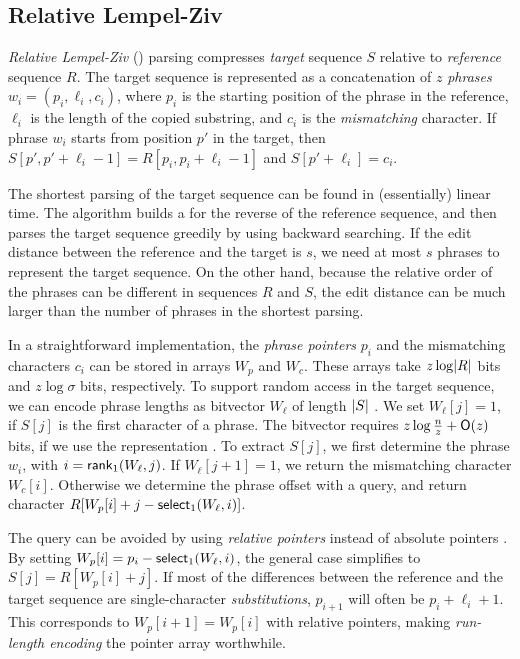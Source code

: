 \subsection{Relative Lempel-Ziv}\label{sect:rlz}

\emph{Relative Lempel-Ziv} (\RLZ) parsing \cite{Kuruppu2010} compresses
\emph{target} sequence $S$ relative to \emph{reference} sequence $R$. The
target sequence is represented as a concatenation of $z$ \emph{phrases} $w_{i}
= (p_{i}, \ell_{i}, c_{i})$, where $p_{i}$ is the starting position of the
phrase in the reference, $\ell_{i}$ is the length of the copied substring, and
$c_{i}$ is the \emph{mismatching} character. If phrase $w_{i}$ starts from
position $p'$ in the target, then $S[p',p'+\ell_{i}-1] =
R[p_{i},p_{i}+\ell_{i}-1]$ and $S[p'+\ell_{i}] = c_{i}$.

The shortest \RLZ{} parsing of the target sequence can be found in
(essentially) linear time. The algorithm builds a \CSA{} for the reverse of
the reference sequence, and then parses the target sequence greedily by using
backward searching. If the edit distance between the reference and the target
is $s$, we need at most $s$ phrases to represent the target sequence. On the
other hand, because the relative order of the phrases can be different in
sequences $R$ and $S$, the edit distance can be much larger than the number of
phrases in the shortest \RLZ{} parsing.

In a straightforward implementation, the \emph{phrase pointers} $p_{i}$ and
the mismatching characters $c_{i}$ can be stored in arrays $W_{p}$ and
$W_{c}$. These arrays take $z \log \lvert R \rvert$ bits and $z \log \sigma$ bits,
respectively. To support random access in the target sequence, we can encode
phrase lengths as bitvector $W_{\ell}$ of length $\lvert S \rvert$ \cite{Kuruppu2010}.
We set $W_{\ell}[j] = 1$, if $S[j]$ is the first character of a phrase. The
bitvector requires $z \log \frac{n}{z} + \mathsf{O}(z)$ bits, if we use the
\sdarray{} representation \cite{Okanohara2007}. To extract $S[j]$, we first
determine the phrase $w_{i}$, with $i = \mathsf{rank}_{1}(W_{\ell}, j)$. If
$W_{\ell}[j+1] = 1$, we return the mismatching character $W_{c}[i]$. Otherwise
we determine the phrase offset with a \select{} query, and return character
$R[W_{p}[i] + j - \mathsf{select}_{1}(W_{\ell}, i)]$.

The \select{} query can be avoided by using \emph{relative pointers} instead
of absolute pointers \cite{Ferrada2014}. By setting $W_{p}[i] = p_{i} -
\mathsf{select}_{1}(W_{\ell}, i)$, the general case simplifies to $S[j] = R[W_{p}[i]
+ j]$. If most of the differences between the reference and the target
sequence are single-character \emph{substitutions}, $p_{i+1}$ will often be
$p_{i} + \ell_{i} + 1$. This corresponds to $W_{p}[i+1] = W_{p}[i]$ with
relative pointers, making \emph{run-length encoding} the pointer array
worthwhile.


